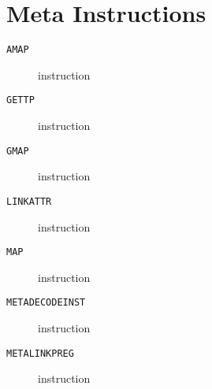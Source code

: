\section{Meta Instructions}
\begin{description}
\item[\texttt{AMAP}] instruction\\

\end{description}
\clearpage
\begin{description}
\item[\texttt{GETTP}] instruction\\

\end{description}
\clearpage
\begin{description}
\item[\texttt{GMAP}] instruction\\

\end{description}
\clearpage
\begin{description}
\item[\texttt{LINKATTR}] instruction\\

\end{description}
\clearpage
\begin{description}
\item[\texttt{MAP}] instruction\\

\end{description}
\clearpage
\begin{description}
\item[\texttt{METADECODEINST}] instruction\\

\end{description}
\clearpage
\begin{description}
\item[\texttt{METALINKPREG}] instruction\\

\end{description}
